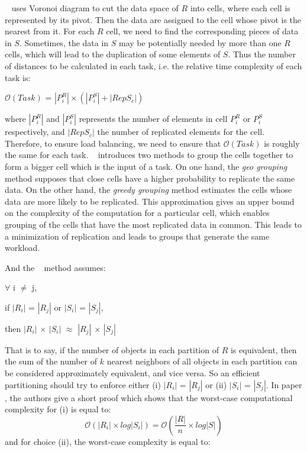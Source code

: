 \VO~ uses Voronoi diagram to cut the data space of $R$ into cells, where each cell is represented 
by its pivot. Then the data are assigned to the cell whose pivot is the nearest from it. For each 
$R$ cell, we need to find the corresponding pieces of data in $S$. Sometimes, the data in $S$ may be 
potentially needed by more than one $R$ cells, which will lead to the duplication of some 
elements of $S$. Thus the number of distances to be calculated in each task, i.e. the relative time 
complexity of each task is:
\begin{center}
$\mathcal{O}\left(Task\right)$ = $\left|P_i^R\right| \times \left(\left|P_i^S\right| + \left|RepS_c\right| \right)$
\end{center}
where $\left|P_i^R\right|$ and $\left|P_i^S\right|$ represents the number of elements in cell $P_i^R$ or 
$P_i^S$ respectively, and $\left|RepS_c\right|$ the number of replicated elements for the cell. 
Therefore, to ensure load balancing, we need to ensure that $\mathcal{O}\left(Task\right)$ is roughly the 
same for each task.
\VO~ introduces two methods to group the cells together to form a bigger cell which is the 
input of a task. \label{pgbj_grouping}
On one hand, the \emph{geo grouping} method supposes that close cells have a higher probability to 
replicate the same data. On the other hand, 
the \emph{greedy grouping} method estimates the cells whose data are more likely to be replicated. This approximation gives an upper bound on 
the complexity of the computation for a particular cell, which enables grouping of the cells that have the most replicated data in 
common. This leads to a minimization of replication and leads to groups that generate the same workload. 

And the \Z~ method assumes:

\begin{center}
$\forall$ i $\neq$ j, 

if $\left| R_i \right|$ = $\left| R_j \right|$ or $\left| S_i \right|$ = $\left| S_j \right|$, 

then $\left| R_i \right|$ $\times$ $\left| S_i \right|$ $\approx$ $\left| R_j \right|$ $\times$ $\left| S_j \right|$
\end{center} 
That is to say, if the number of objects in each partition of $R$ is equivalent, then the sum of 
the number of $k$ nearest neighbors of all objects in each partition can be considered 
approximately equivalent, and vice versa.
So an efficient partitioning should try to enforce either (i) $\left| R_i \right|$ = $\left| R_j 
\right|$ or (ii) $\left| S_i \right|$ = $\left| S_j 
\right|$.
In paper \cite{Zhang:2012:EPK:2247596.2247602}, the authors give a short proof which 
shows that the worst-case computational complexity for (i) is equal to:
\begin{equation}
\mathcal{O}\left(\left|R_i\right| \times log\left|S_i\right|\right) = \mathcal{O}\left(\frac{\left|R\right|}{n} \times log\left|S\right|\right) \label{eq:complexity1}
\end{equation}
and for choice (ii), the worst-case complexity is equal to:

